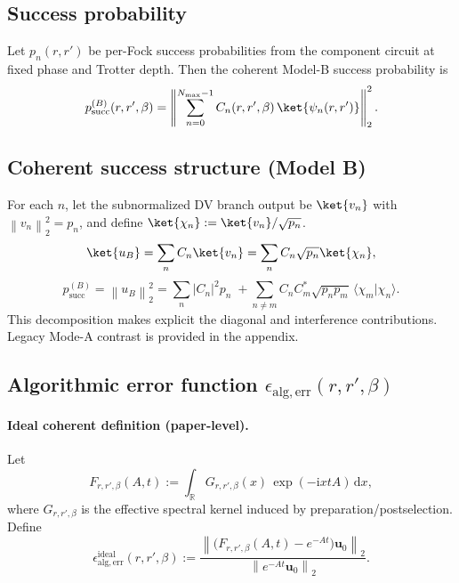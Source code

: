 \documentclass[11pt]{article}
\newcommand{\dd}{\mathrm{d}}
\newcommand{\ii}{\mathrm{i}}
\newcommand{\RR}{\mathbb{R}}
\newcommand{\norm}[1]{\left\lVert #1 \right\rVert}
\begin{document}
\subsection{Success probability}
Let \(p_n(r,r')\) be per-Fock success probabilities from the component circuit at fixed
phase and Trotter depth.
Then the coherent Model-B success probability is
\begin{equation}
p_{\mathrm{succ}}^{(B)}(r,r',\beta)
=
\left\|
\sum_{n=0}^{N_{\max}-1} C_n(r,r',\beta)\,\ket{\psi_n(r,r')}
\right\|_2^2.
\label{eq:psucc_rrb}
\end{equation}

\subsection{Coherent success structure (Model B)}
For each \(n\), let the subnormalized DV branch output be \(\ket{v_n}\) with
\(\norm{v_n}_2^2=p_n\), and define \(\ket{\chi_n}:=\ket{v_n}/\sqrt{p_n}\).
\[
\ket{u_B}=\sum_n C_n\ket{v_n}
=\sum_n C_n\sqrt{p_n}\ket{\chi_n},
\]
\[
p_{\mathrm{succ}}^{(B)}=\norm{u_B}_2^2
=\sum_n |C_n|^2p_n
\;+\!\!\sum_{n\neq m} C_n C_m^*\sqrt{p_np_m}\,\langle\chi_m|\chi_n\rangle.
\]
This decomposition makes explicit the diagonal and interference contributions.
Legacy Mode-A contrast is provided in the appendix.

\subsection{Algorithmic error function \texorpdfstring{$\epsilon_{\mathrm{alg,err}}(r,r',\beta)$}{epsilon_alg_err(r,r',beta)}}
\paragraph{Ideal coherent definition (paper-level).}
Let
\[
F_{r,r',\beta}(A,t)
:=
\int_{\RR} G_{r,r',\beta}(x)\,\exp(-\ii xtA)\,\dd x,
\]
where \(G_{r,r',\beta}\) is the effective spectral kernel induced by preparation/postselection.
Define
\begin{equation}
\epsilon_{\mathrm{alg,err}}^{\mathrm{ideal}}(r,r',\beta)
:=
\frac{\norm{\big(F_{r,r',\beta}(A,t)-e^{-At}\big)\mathbf u_0}_2}{\norm{e^{-At}\mathbf u_0}_2}.
\label{eq:eps_alg_ideal}
\end{equation}
\end{document}
